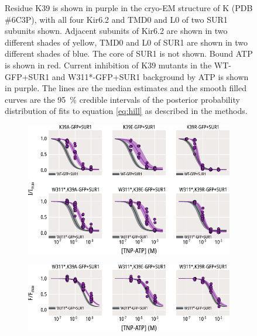 \begin{figure}[hbtp]
{	 Residue K39 is shown in purple in the cryo-EM structure of K\ATP{} (PDB \#6C3P), with all four Kir6.2 and TMD0 and L0 of two SUR1 subunits shown.
	Adjacent subunits of Kir6.2 are shown in two different shades of yellow, TMD0 and L0 of SUR1 are shown in two different shades of blue.
	The core of SUR1 is not shown.
	Bound ATP is shown in red.
	 Current inhibition of K39 mutants in the WT-GFP+SUR1 and W311*-GFP+SUR1 background by ATP is shown in purple.
	The lines are the median estimates and the smooth filled curves are the \SI{95}{\percent} credible intervals of the posterior probability distribution of fits to equation \ref{eq:hill} as described in the methods.
	}\label{ch5fig:k39_1}
\end{figure}

\begin{figure}[hbtp]
	\centering
	\begin{subfigure}[t]{0.9\textwidth}
		\caption{}\label{ch5fig:k39_tnpatp_popfits_1}
		\centering
		\includegraphics[width=\textwidth]{k39_3.pdf}
	\end{subfigure}
	\vfill
	\begin{subfigure}[t]{0.9\textwidth}
		\caption{}\label{ch5fig:k39_tnpatp_popfits_2}
		\centering
		\includegraphics[width=\textwidth]{k39_4.pdf}

\end{subfigure}
\end{figure}

